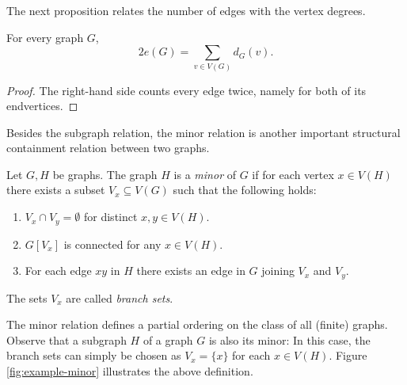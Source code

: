 The next proposition relates the number of edges with the vertex degrees.
\begin{proposition}
    For every graph $G$, 
    \begin{equation*}
        2 e(G) = \sum_{v \in V(G)} d_G(v).
    \end{equation*}
\end{proposition}

\begin{proof}
    The right-hand side counts every edge twice, namely for both of its endvertices.
\end{proof}

Besides the subgraph relation, the minor relation is another important structural containment relation between two graphs.
\begin{definition}
    Let $G, H$ be graphs. The graph $H$ is a \textit{minor} of $G$ if for each vertex $x \in V(H)$ there exists a subset $V_x \subseteq V(G)$ such that the following holds:
    \begin{enumerate}
        \item $V_x \cap V_y = \emptyset$ for distinct $x, y \in V(H)$.
        \item $G[V_x]$ is connected for any $x \in V(H)$.
        \item For each edge $xy$ in $H$ there exists an edge in $G$ joining $V_x$ and $V_y$.
    \end{enumerate}
    The sets $V_x$ are called \textit{branch sets}.
\end{definition}

The minor relation defines a partial ordering on the class of all (finite) graphs. 
Observe that a subgraph $H$ of a graph $G$ is also its minor:
In this case, the branch sets can simply be chosen as $V_x = \{x\}$ for each $x \in V(H)$.
Figure \ref{fig:example-minor} illustrates the above definition.

